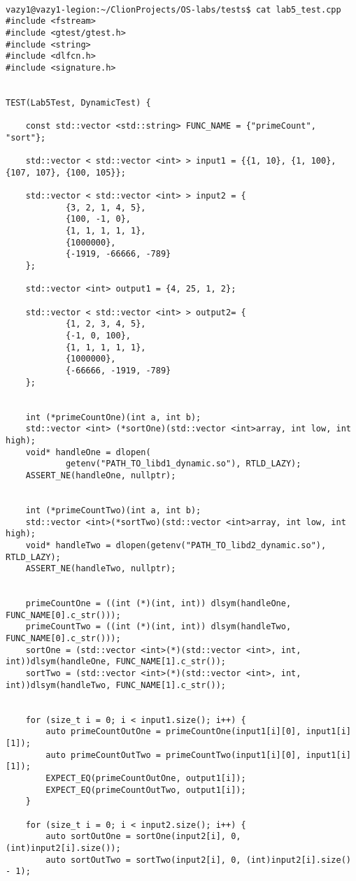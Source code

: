 \documentclass[pdf, unicode, 12pt, a4paper,oneside,fleqn]{article}
\begin{document}
{\scriptsize
\begin{verbatim}

vazy1@vazy1-legion:~/ClionProjects/OS-labs/tests$ cat lab5_test.cpp
#include <fstream>
#include <gtest/gtest.h>
#include <string>
#include <dlfcn.h>
#include <signature.h>


TEST(Lab5Test, DynamicTest) {

    const std::vector <std::string> FUNC_NAME = {"primeCount", "sort"};

    std::vector < std::vector <int> > input1 = {{1, 10}, {1, 100}, {107, 107}, {100, 105}};

    std::vector < std::vector <int> > input2 = {
            {3, 2, 1, 4, 5},
            {100, -1, 0},
            {1, 1, 1, 1, 1},
            {1000000},
            {-1919, -66666, -789}
    };

    std::vector <int> output1 = {4, 25, 1, 2};

    std::vector < std::vector <int> > output2= {
            {1, 2, 3, 4, 5},
            {-1, 0, 100},
            {1, 1, 1, 1, 1},
            {1000000},
            {-66666, -1919, -789}
    };


    int (*primeCountOne)(int a, int b);
    std::vector <int> (*sortOne)(std::vector <int>array, int low, int high);
    void* handleOne = dlopen(
            getenv("PATH_TO_libd1_dynamic.so"), RTLD_LAZY);
    ASSERT_NE(handleOne, nullptr);


    int (*primeCountTwo)(int a, int b);
    std::vector <int>(*sortTwo)(std::vector <int>array, int low, int high);
    void* handleTwo = dlopen(getenv("PATH_TO_libd2_dynamic.so"), RTLD_LAZY);
    ASSERT_NE(handleTwo, nullptr);


    primeCountOne = ((int (*)(int, int)) dlsym(handleOne, FUNC_NAME[0].c_str()));
    primeCountTwo = ((int (*)(int, int)) dlsym(handleTwo, FUNC_NAME[0].c_str()));
    sortOne = (std::vector <int>(*)(std::vector <int>, int, int))dlsym(handleOne, FUNC_NAME[1].c_str());
    sortTwo = (std::vector <int>(*)(std::vector <int>, int, int))dlsym(handleTwo, FUNC_NAME[1].c_str());


    for (size_t i = 0; i < input1.size(); i++) {
        auto primeCountOutOne = primeCountOne(input1[i][0], input1[i][1]);
        auto primeCountOutTwo = primeCountTwo(input1[i][0], input1[i][1]);
        EXPECT_EQ(primeCountOutOne, output1[i]);
        EXPECT_EQ(primeCountOutTwo, output1[i]);
    }

    for (size_t i = 0; i < input2.size(); i++) {
        auto sortOutOne = sortOne(input2[i], 0, (int)input2[i].size());
        auto sortOutTwo = sortTwo(input2[i], 0, (int)input2[i].size() - 1);



\end{verbatim}}
\end{document}

